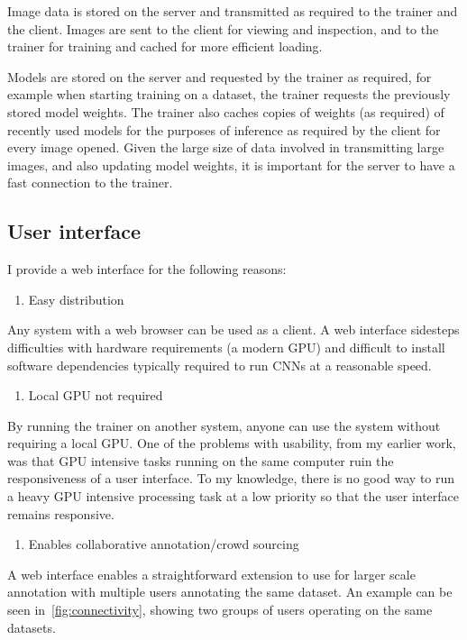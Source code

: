 Image data is stored on the server and transmitted as required to the trainer and the client. Images are sent to the client for viewing and inspection, and to the trainer for training and cached for more efficient loading. 

Models are stored on the server and requested by the trainer as required, for example when starting training on a dataset, the trainer requests the previously stored model weights. The trainer also caches copies of weights (as required) of recently used models for the purposes of inference as required by the client for every image opened. Given the large size of data involved in transmitting large images, and also updating model weights, it is important for the server to have a fast connection to the trainer.

\subsection {User interface}

I provide a web interface for the following reasons:

\begin{enumerate}
    \item Easy distribution
\end{enumerate}
Any system with a web browser can be used as a client. A web interface sidesteps difficulties with hardware requirements (a modern \gls{GPU}) and difficult to install software dependencies typically required to run \gls{CNN}s at a reasonable speed.
\begin{enumerate}[resume]
    \item Local GPU not required
\end{enumerate}
By running the trainer on another system, anyone can use the system without requiring a local GPU. One of the problems with usability, from my earlier work, was that GPU intensive tasks running on the same computer ruin the responsiveness of a user interface. To my knowledge, there is no good way to run a heavy \gls{GPU} intensive processing task at a low priority so that the user interface remains responsive.
\begin{enumerate}[resume]
    \item Enables collaborative annotation/crowd sourcing
\end{enumerate}
A web interface enables a straightforward extension to use for larger scale annotation with multiple users annotating the same dataset. An example can be seen in~\ref{fig:connectivity}, showing two groups of users operating on the same datasets.


